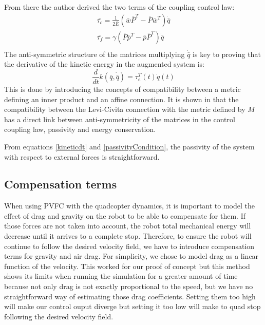 From there the author derived the two terms of the coupling control law: 
\begin{align}
    \bar{\tau_c} = \frac{1}{2\bar{E}}(\bar{w}\bar{P}^T - \bar{P}\bar{w}^T ) \dot{\bar{q}} \label{tauc}\\
    \bar{\tau_f} = \gamma(\bar{P}\bar{p}^T - \bar{p}\bar{P}^T ) \dot{\bar{q}} \label{tauf}\\
\end{align}
The anti-symmetric structure of the matrices multiplying $\dot{\bar{q}}$ is key to proving that the derivative of the kinetic energy in the augmented system is: 
\begin{equation}
    \frac{d}{dt}k(\bar{q}, \dot{\bar{q}}) = \tau_e^T(t)\dot{q}(t) \label{kineticdt}
\end{equation}
This is done by introducing the concepts of compatibility between a metric defining an inner product and an affine connection. It is shown in \cite{li2001passive} that the compatibility between the Levi-Civita connection with the metric defined by $M$ has a direct link between anti-symmetricity of the matrices in the control coupling law, passivity and energy conservation.

From equations \ref{kineticdt} and \ref{passivityCondition}, the passivity of the system with respect to external forces is straightforward.

\subsection{Compensation terms}
When using PVFC with the quadcopter dynamics, it is important to model the effect of drag and gravity on the robot to be able to compensate for them. If those forces are not taken into account, the robot total mechanical energy will decrease until it arrives to a complete stop. 
Therefore, to ensure the robot will continue to follow the desired velocity field, we have to introduce compensation terms for gravity and air drag. 
For simplicity, we chose to model drag as a linear function of the velocity. This worked for our proof of concept but this method 
shows its limits when running the simulation for a greater amount of time because not only drag is not exactly proportional to the speed, but we have no straightforward way of estimating those drag coefficients.
Setting them too high will make our control ouput diverge but setting it too low will make to quad stop following the desired velocity field.  

